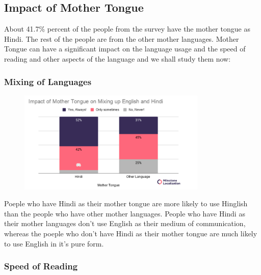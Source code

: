 \documentclass{article}
\begin{document}
\subsection{Impact of Mother Tongue}

About 41.7\% percent of the people from the survey have the mother tongue as Hindi. The rest of the people are from the other mother languages. Mother Tongue can have a significant impact on the language usage and the speed of reading and other aspects of the language and we shall study them now:

\subsubsection{Mixing of Languages}

\begin{figure}[H]
    \centering
    \includegraphics[width=0.8\textwidth]{plots/mother_mixing_language.png}
\end{figure}
Poeple who have Hindi as their mother tongue are more likely to use Hinglish than the people who have other mother languages. People who have Hindi as their mother languages don't use English as their medium of communication, whereas the poeple who don't have Hindi as their mother tongue are much likely to use English in it's pure form. 

\subsubsection{Speed of Reading}
\end{document}
